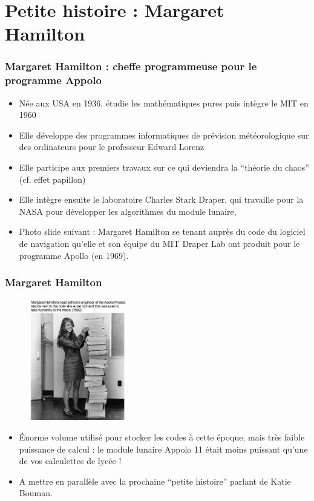 \documentclass{beamer}
\begin{document}




\section{Petite histoire : Margaret Hamilton}

\frame
{
\frametitle{Margaret Hamilton : cheffe programmeuse pour le programme Appolo}
\begin{itemize}
\item Née aux USA en 1936, étudie les mathématiques pures puis intègre le MIT en 1960
\item Elle développe des programmes informatiques de prévision météorologique sur des ordinateurs pour le professeur Edward Lorenz
\item Elle participe aux premiers travaux sur ce qui deviendra la ``théorie du chaos'' (cf. effet papillon)
\item Elle intègre ensuite le laboratoire Charles Stark Draper, qui travaille pour la NASA pour développer les algorithmes du module lunaire,
\item Photo slide suivant : Margaret Hamilton se tenant auprès du code du logiciel de navigation qu'elle et son équipe du MIT Draper Lab ont produit pour le programme Apollo (en 1969).
\end{itemize}
}

\frame
{
\frametitle{Margaret Hamilton}
{\footnotesize
\begin{figure}
  \includegraphics[height=150pt]{margaret_hamilton.jpeg}
\end{figure}
\begin{itemize}
  \item Énorme volume utilisé pour stocker les codes à cette époque, mais très faible puissance de calcul : le module lunaire Appolo 11 était moins puissant qu'une de vos calculettes de lycée !
  \item A mettre en parallèle avec la prochaine ``petite histoire'' parlant de Katie Bouman.
\end{itemize}
}
}
\end{document}
